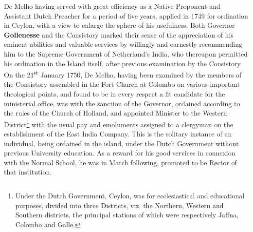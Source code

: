 \documentclass{article}
\begin{document}
De Melho having served with great efficiency as a Native Proponent and Assistant Dutch Preacher for a period of five years, applied in 1749 for ordination in Ceylon, with a view to enlarge the sphere of his usefulness. Both Governor \textbf{Gollenesse} and the Consistory marked their sense of the appreciation of his eminent abilities and valuable services by willingly and earnestly recommending him to the Supreme Government of Netherland's India, who thereupon permitted his ordination in the Island itself, after previous examination by the Consistory. On the 21\textsuperscript{st} January 1750, De Melho, having been examined by the members of the Consistory assembled in the Fort Church at Colombo on various important theological points, and found to be in every respect a fit candidate for the ministerial office, was with the sanction of the Governor, ordained according to the rules of the Church of Holland, and appointed Minister to the Western District\footnote{Under the Dutch Government, Ceylon, was for ecclesiastical and educational purposes, divided into three Districts, viz. the Northern, Western and Southern districts, the principal stations of which were respectively Jaffna, Colombo and Galle.} with the usual pay and emoluments assigned to a clergyman on the establishment of the East India Company. This is the solitary instance of an individual, being ordained in the island, under the Dutch Government without previous University education. As a reward for his good services in connexion with the Normal School, he was in March following, promoted to be Rector of that institution.
\end{document}
